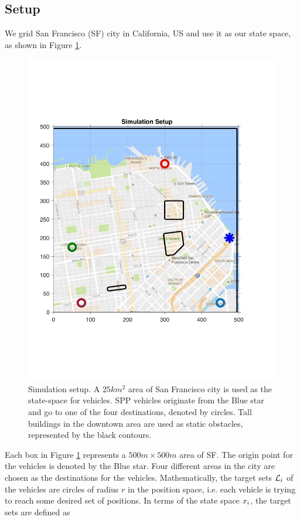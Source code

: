 \subsection{Setup \label{sec:city_simSetup}}
We grid San Francisco (SF) city in California, US and use it as our state space, as shown in Figure \ref{fig:sf_setup}. 
\begin{figure}[H]
  \centering
  \includegraphics[width=\columnwidth]{"figs/sf_setup"}
  \caption{Simulation setup. A $25 km^2$ area of San Francisco city is used as the state-space for vehicles. SPP vehicles originate from the Blue star and go to one of the four destinations, denoted by circles. Tall buildings in the downtown area are used as static obstacles, represented by the black contours.}
  \label{fig:sf_setup}
\end{figure}
Each box in Figure \ref{fig:sf_setup} represents a $500m \times 500m$ area of SF. The origin point for the vehicles is denoted by the Blue star. Four different areas in the city are chosen as the destinations for the vehicles. Mathematically, the target sets $\mathcal{L}_i$ of the vehicles are circles of radius $r$ in the position space, i.e. each vehicle is trying to reach some desired set of positions. In terms of the state space $x_i$, the target sets are defined as
